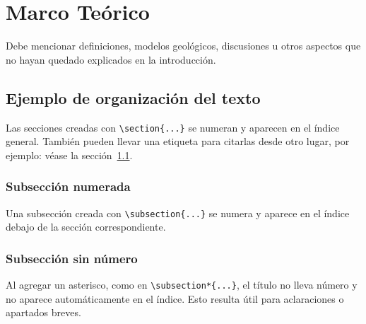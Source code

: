 \chapter{Marco Teórico}
Debe mencionar definiciones, modelos geológicos, discusiones u otros aspectos que no hayan quedado explicados en la introducción.

\section{Ejemplo de organización del texto}\label{sec:ejemplo-organizacion}

Las secciones creadas con \verb|\section{...}| se numeran y aparecen en el
índice general. También pueden llevar una etiqueta para citarlas desde otro
lugar, por ejemplo: véase la sección~\ref{sec:ejemplo-organizacion}.

\subsection{Subsección numerada}

Una subsección creada con \verb|\subsection{...}| se numera y aparece en el
índice debajo de la sección correspondiente.

\subsection*{Subsección sin número}

Al agregar un asterisco, como en \verb|\subsection*{...}|, el título no lleva
número y no aparece automáticamente en el índice. Esto resulta útil para
aclaraciones o apartados breves.
